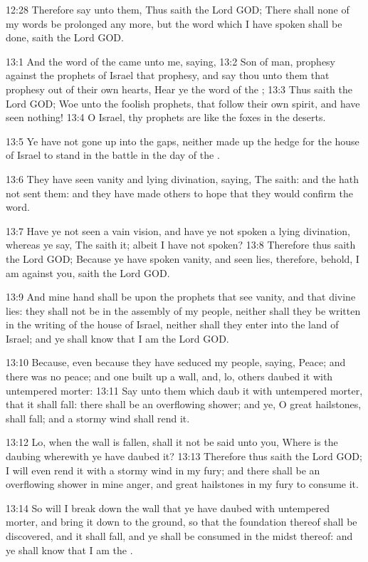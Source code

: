 12:28 Therefore say unto them, Thus saith the Lord GOD; There shall none of my words be prolonged any more, but the word which I have spoken shall be done, saith the Lord GOD.

13:1 And the word of the \LORD came unto me, saying, 13:2 Son of man, prophesy against the prophets of Israel that prophesy, and say thou unto them that prophesy out of their own hearts, Hear ye the word of the \LORD; 13:3 Thus saith the Lord GOD; Woe unto the foolish prophets, that follow their own spirit, and have seen nothing!  13:4 O Israel, thy prophets are like the foxes in the deserts.

13:5 Ye have not gone up into the gaps, neither made up the hedge for the house of Israel to stand in the battle in the day of the \LORD.

13:6 They have seen vanity and lying divination, saying, The \LORD saith: and the \LORD hath not sent them: and they have made others to hope that they would confirm the word.

13:7 Have ye not seen a vain vision, and have ye not spoken a lying divination, whereas ye say, The \LORD saith it; albeit I have not spoken?  13:8 Therefore thus saith the Lord GOD; Because ye have spoken vanity, and seen lies, therefore, behold, I am against you, saith the Lord GOD.

13:9 And mine hand shall be upon the prophets that see vanity, and that divine lies: they shall not be in the assembly of my people, neither shall they be written in the writing of the house of Israel, neither shall they enter into the land of Israel; and ye shall know that I am the Lord GOD.

13:10 Because, even because they have seduced my people, saying, Peace; and there was no peace; and one built up a wall, and, lo, others daubed it with untempered morter: 13:11 Say unto them which daub it with untempered morter, that it shall fall: there shall be an overflowing shower; and ye, O great hailstones, shall fall; and a stormy wind shall rend it.

13:12 Lo, when the wall is fallen, shall it not be said unto you, Where is the daubing wherewith ye have daubed it?  13:13 Therefore thus saith the Lord GOD; I will even rend it with a stormy wind in my fury; and there shall be an overflowing shower in mine anger, and great hailstones in my fury to consume it.

13:14 So will I break down the wall that ye have daubed with untempered morter, and bring it down to the ground, so that the foundation thereof shall be discovered, and it shall fall, and ye shall be consumed in the midst thereof: and ye shall know that I am the \LORD.

